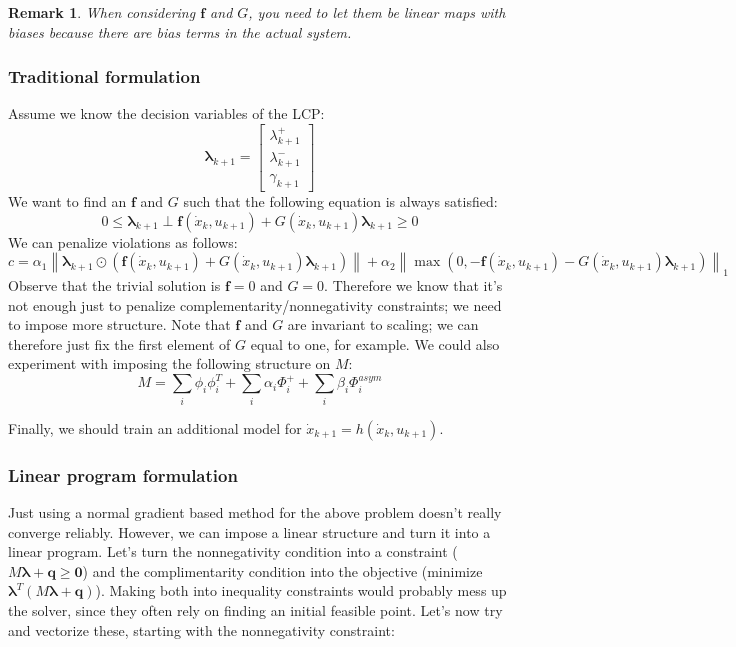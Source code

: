 \documentclass{article}
\newtheorem{remark}{Remark}
\renewcommand{\vec}[1]{\boldsymbol{#1}}
\newcommand{\norm}[1]{\left\lVert#1\right\rVert}
\begin{document}
\begin{remark}
    When considering $\vec{f}$ and $G$, you need to let them be linear maps with biases because there are bias terms in the actual system. 
\end{remark}

\subsubsection{Traditional formulation}
Assume we know the decision variables of the LCP:
\[
    \vec{\lambda}_{k+1} =
    \begin{bmatrix}
        \lambda^+_{k+1} \\
        \lambda^-_{k+1} \\
        \gamma_{k+1}
    \end{bmatrix}
\]
We want to find an $\vec{f}$ and $G$ such that the following equation is always satisfied:
\[
    0 \leq \vec{\lambda}_{k+1} \perp \vec{f}(\dot x_k, u_{k+1}) + G(\dot x_k, u_{k+1}) \vec{\lambda}_{k+1} \geq 0
\]
We can penalize violations as follows:
\[
    c = \alpha_1 \norm{\vec{\lambda}_{k+1} \odot (\vec{f}(\dot x_k, u_{k+1}) + G(\dot x_k, u_{k+1}) \vec{\lambda}_{k+1})} + \alpha_2 \norm{\max \left(0, -\vec{f}(\dot x_k, u_{k+1}) - G(\dot x_k, u_{k+1}) \vec{\lambda}_{k+1}\right)}_1
\] 
Observe that the trivial solution is $\vec{f} = 0$ and $G = 0$. Therefore we know that it's not enough just to penalize complementarity/nonnegativity constraints; we need to impose more structure. Note that $\vec{f}$ and $G$ are invariant to scaling; we can therefore just fix the first element of $G$ equal to one, for example. We could also experiment with imposing the following structure on $M$:
\[
    M = \sum_i \phi_i \phi_i^T + \sum_i \alpha_i \Phi_i^+ + \sum_i \beta_i \Phi_i^{asym}
\]

Finally, we should train an additional model for $\dot x_{k+1} = h(\dot x_k, u_{k+1})$.

\subsubsection{Linear program formulation}
Just using a normal gradient based method for the above problem doesn't really converge reliably. However, we can impose a linear structure and turn it into a linear program. Let's turn the nonnegativity condition into a constraint ($M \vec{\lambda} + \vec{q} \geq \vec{0}$) and the complimentarity condition into the objective (minimize $\vec{\lambda}^T (M \vec{\lambda} + \vec{q})$). Making both into inequality constraints would probably mess up the solver, since they often rely on finding an initial feasible point. Let's now try and vectorize these, starting with the nonnegativity constraint:
\end{document}
